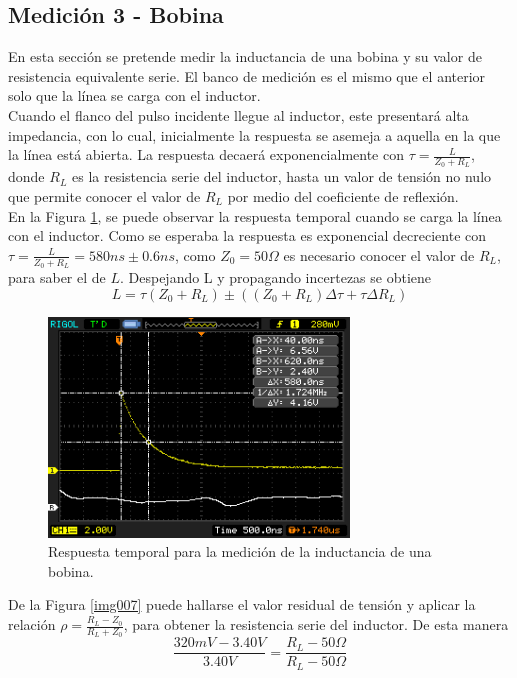 \documentclass[a4paper,10pt]{article}
\begin{document}
						
	\subsection{Medición 3 - Bobina}
	\indent En esta secci\'on se pretende medir la inductancia de una bobina y
	su valor de resistencia equivalente serie. El banco de medici\'on es el 
	mismo que el anterior solo que la l\'inea se carga con el inductor. \\
	\indent Cuando el flanco del pulso incidente llegue al inductor, este 
	presentar\'a alta impedancia, con lo cual, inicialmente la respuesta se 
	asemeja a aquella en la que la l\'inea est\'a abierta. La respuesta 
	decaer\'a exponencialmente con $\tau=\frac{L}{Z_0+R_L}$, donde $R_L$ es la
	resistencia serie del inductor, hasta un valor de tensi\'on no nulo que 
	permite conocer el valor de $R_L$ por medio del coeficiente de 
	reflexi\'on. \\
	\indent En la Figura \ref{img006}, se puede observar la respuesta temporal
	cuando se carga la l\'inea con el inductor. Como se esperaba la respuesta
	es exponencial decreciente con 
	$\tau=\frac{L}{Z_0+R_L}=580ns\pm 0.6ns$, como $Z_0=50\Omega$ es 
	necesario conocer el valor de $R_L$, para saber el de $L$. Despejando L y propagando incertezas se obtiene
	$$L=\tau(Z_0+R_L)\pm ( (Z_0+R_L)\Delta\tau+\tau\Delta R_L)$$
		
		\begin{figure}[!htb]
			\centering
			\includegraphics[width=8cm]
			{Imagenes/InductorL.png}
			\caption{Respuesta temporal para la medici\'on de la inductancia 
			de una bobina.}
			\label{img006}
		\end{figure}

	\indent De la Figura \ref{img007} puede hallarse el valor residual de 
	tensi\'on y aplicar la relaci\'on  $\rho=\frac{R_L-Z_0}{R_L+Z_0}$, para 
	obtener la resistencia serie del inductor. De esta manera 
	$$\frac{320mV-3.40V}{3.40V}=\frac{R_L-50\Omega}{R_L-50\Omega}$$
	
\end{document}
